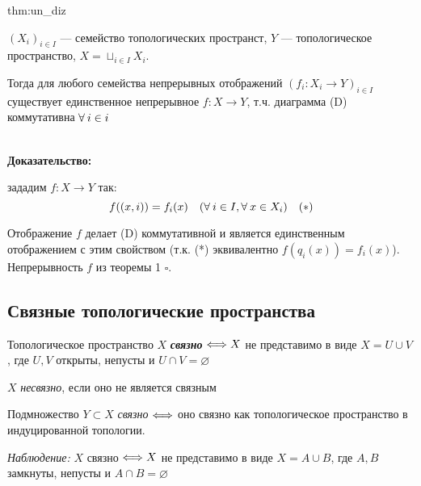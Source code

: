 \documentclass[../../main.tex]{subfiles}
\begin{document}
\begin{theo}{thm:un_diz}

$(X_i)_{i \in I}$ — семейство топологических пространст, $Y$ — топологическое пространство, $X = \sqcup_{i \in I} X_i$.

Тогда для любого семейства непрерывных отображений $(f_i \colon X_i \to Y)_{i \in I}$ существует единственное непрерывное $f \colon X \to Y$, т.ч. диаграмма (D) коммутативна $\forall\: i \in i$

\begin{minipage}{0.2\linewidth}
\end{minipage}
\begin{minipage}{0.75\linewidth}

\textbf{\\Доказательство:} 

зададим $f \colon X \to Y$ так:
$$f(\left (x, i) \right) = f_i (x) \quad (\forall\: i \in I, \forall\: x \in X_i) \quad (*)$$

Отображение $f$ делает (D) коммутативной и является единственным отображением с этим свойством (т.к. (*) эквивалентно $f(q_i(x)) = f_i(x)$).\\ Непрерывность $f$ из теоремы 1 $\square$. 
\end{minipage}

\end{theo}

\subsection{Связные топологические пространства}

 Топологическое пространство $X$ \textit{\textbf{связно}} $\Longleftrightarrow X $ не представимо в виде $X = U \cup V$, где $U, V$ открыты, непусты и $U \cap V = \varnothing$

$X$ \textit{несвязно}, если оно не является связным

Подмножество $Y \subset X$ \textit{связно} $\Longleftrightarrow$ оно связно как топологическое пространство в индуцированной топологии.

\textit{Наблюдение:} $X$ связно $\Longleftrightarrow X$ не представимо в виде $X = A \cup B$, где $A, B$ замкнуты, непусты и $A \cap B = \varnothing$
\end{document}
